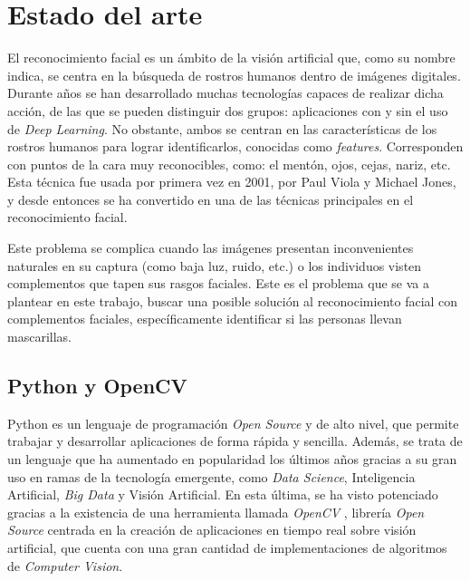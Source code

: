 
\chapter{Estado del arte} \label{cap:2}

\vspace{-1cm}
El reconocimiento facial es un ámbito de la visión artificial que, como su nombre indica, se centra en la búsqueda de rostros humanos dentro de imágenes digitales. Durante años se han desarrollado muchas tecnologías capaces de realizar dicha acción, de las que se pueden distinguir dos grupos: aplicaciones con y sin el uso de \textit{Deep Learning}. No obstante, ambos se centran en las características de los rostros humanos para lograr identificarlos, conocidas como \textit{features}. Corresponden con puntos de la cara muy reconocibles, como: el mentón, ojos, cejas, nariz, etc. Esta técnica fue usada por primera vez en 2001, por Paul Viola y Michael Jones, y desde entonces se ha convertido en una de las técnicas principales en el reconocimiento facial.

Este problema se complica cuando las imágenes presentan inconvenientes naturales en su captura (como baja luz, ruido, etc.) o los individuos visten complementos que tapen sus rasgos faciales. Este es el problema que se va a plantear en este trabajo, buscar una posible solución al reconocimiento facial con complementos faciales, específicamente identificar si las personas llevan mascarillas.

\vspace{-0.7cm}
\section{Python y OpenCV}
\vspace{-0.5cm}

Python es un lenguaje de programación \textit{Open Source} y de alto nivel, que permite trabajar y desarrollar aplicaciones de forma rápida y sencilla. Además, se trata de un lenguaje que ha aumentado en popularidad los últimos años gracias a su gran uso en ramas de la tecnología emergente, como \textit{Data Science}, Inteligencia Artificial, \textit{Big Data} y Visión Artificial. En esta última, se ha visto potenciado gracias a la existencia de una herramienta llamada \textit{OpenCV} \cite{opencv}, librería \textit{Open Source} centrada en la creación de aplicaciones en tiempo real sobre visión artificial, que cuenta con una gran cantidad de implementaciones de algoritmos de \textit{Computer Vision}.

